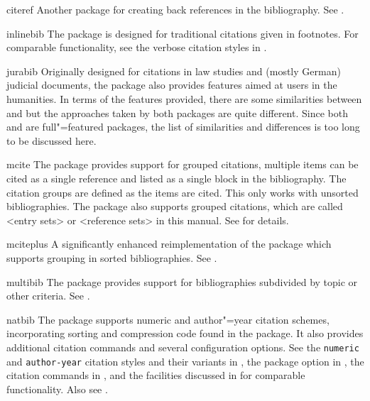 \documentclass{ltxdockit}[2011/03/25]
\begin{document}
\begin{marglist}
\item[citeref]
Another package for creating back references in the bibliography. See .

\item[inlinebib]
The  package is designed for traditional citations given in footnotes. For comparable functionality, see the verbose citation styles in .

\item[jurabib]
Originally designed for citations in law studies and (mostly German) judicial documents, the  package also provides features aimed at users in the humanities. In terms of the features provided, there are some similarities between  and  but the approaches taken by both packages are quite different. Since both  and  are full"=featured packages, the list of similarities and differences is too long to be discussed here.

\item[mcite]
The  package provides support for grouped citations, \ie multiple items can be cited as a single reference and listed as a single block in the bibliography. The citation groups are defined as the items are cited. This only works with unsorted bibliographies. The  package also supports grouped citations, which are called <entry sets> or <reference sets> in this manual. See  for details.

\item[mciteplus]
A significantly enhanced reimplementation of the  package which supports grouping in sorted bibliographies. See .

\item[multibib]
The  package provides support for bibliographies subdivided by topic or other criteria. See .

\item[natbib]
The  package supports numeric and author"=year citation schemes, incorporating sorting and compression code found in the  package. It also provides additional citation commands and several configuration options. See the \texttt{numeric} and \texttt{author-year} citation styles and their variants in , the  package option in , the citation commands in , and the facilities discussed in  for comparable functionality. Also see .


\end{marglist}
\end{document}
